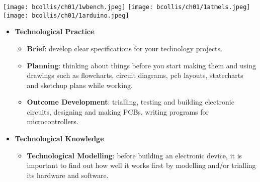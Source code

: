 \texttt{[image: bcollis/ch01/1wbench.jpeg]}
\texttt{[image: bcollis/ch01/1atmels.jpeg]}
\texttt{[image: bcollis/ch01/1arduino.jpeg]}


\secdown
{}

\begin{itemize}
  \item \textbf{Technological Practice\\}
  \begin{itemize}
    \item \textbf{Brief}: develop clear specifications for your technology
    projects.\\
    \item \textbf{Planning}: thinking about things before you start making them
    and using drawings such as flowcharts, circuit diagrams, pcb layouts,
    statecharts and sketchup plans while working.\\
    \item \textbf{Outcome Development}: trialling, testing and building
    electronic circuits, designing and making PCBs, writing programs for
    microcontrollers.\\
  \end{itemize}
  \item \textbf{Technological Knowledge\\}
  \begin{itemize}
    \item \textbf{Technological Modelling}: before building an electronic
    device, it is important to find out how well it works first by modelling
    and/or trialling its hardware and software.\\
\end{itemize}
\end{itemize}
